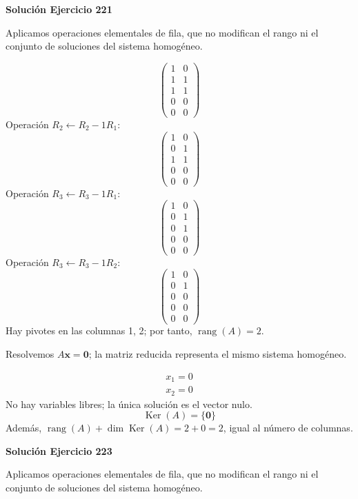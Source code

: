 \documentclass[12pt]{article}
\theoremstyle{remark}
\newcommand{\rang}{\operatorname{rang}}
\newcommand{\Ker}{\operatorname{Ker}}
\newcommand{\vect}[1]{\boldsymbol{#1}}
\begin{document}
\par\bigskip\noindent\textbf{Solución Ejercicio 221}\par\nobreak
Aplicamos operaciones elementales de fila, que no modifican el rango ni el conjunto de soluciones del sistema homogéneo.

\[
\begin{pmatrix}1&0\\1&1\\1&1\\0&0\\0&0\end{pmatrix}
\]
Operación $R_{2}\leftarrow R_{2}-1R_{1}$:
\[
\begin{pmatrix}1&0\\0&1\\1&1\\0&0\\0&0\end{pmatrix}
\]
Operación $R_{3}\leftarrow R_{3}-1R_{1}$:
\[
\begin{pmatrix}1&0\\0&1\\0&1\\0&0\\0&0\end{pmatrix}
\]
Operación $R_{3}\leftarrow R_{3}-1R_{2}$:
\[
\begin{pmatrix}1&0\\0&1\\0&0\\0&0\\0&0\end{pmatrix}
\]
Hay pivotes en las columnas 1, 2; por tanto, $\boxed{\rang(A)=2}$.

Resolvemos $A\vect x=\vect0$; la matriz reducida representa el mismo sistema homogéneo.

\[
\begin{aligned}x_{1}=0\\x_{2}=0\end{aligned}
\]
No hay variables libres; la única solución es el vector nulo.
\[
\boxed{\Ker(A)=\{\vect0\}}
\]
Además, $\rang(A)+\dim\Ker(A)=2+0=2$, igual al número de columnas.


\par\bigskip\noindent\textbf{Solución Ejercicio 223}\par\nobreak
Aplicamos operaciones elementales de fila, que no modifican el rango ni el conjunto de soluciones del sistema homogéneo.
\end{document}

